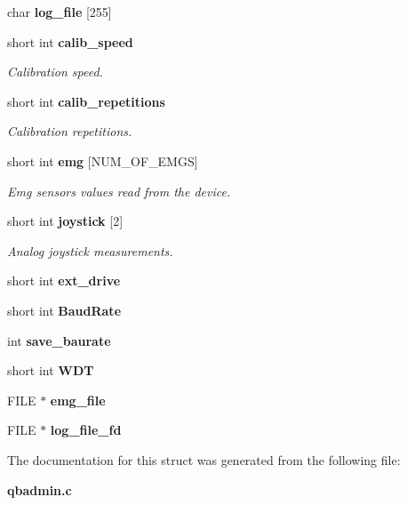 \begin{DoxyCompactItemize}
char {\bfseries log\+\_\+file} [255]
\item 
\mbox{\label{structglobal__args_a74aee2224894f2773538b376bcdd3a65}} 
short int \textbf{ calib\+\_\+speed}
\begin{DoxyCompactList}\small\item\em Calibration speed. \end{DoxyCompactList}\item 
\mbox{\label{structglobal__args_a97358fe57110982e565254fa7310cf8f}} 
short int \textbf{ calib\+\_\+repetitions}
\begin{DoxyCompactList}\small\item\em Calibration repetitions. \end{DoxyCompactList}\item 
\mbox{\label{structglobal__args_ac99613e9febb46b081ae696a20e34c62}} 
short int \textbf{ emg} [N\+U\+M\+\_\+\+O\+F\+\_\+\+E\+M\+GS]
\begin{DoxyCompactList}\small\item\em Emg sensors values read from the device. \end{DoxyCompactList}\item 
\mbox{\label{structglobal__args_a0cace64ae2459f06bc0bda1979b0c06f}} 
short int \textbf{ joystick} [2]
\begin{DoxyCompactList}\small\item\em Analog joystick measurements. \end{DoxyCompactList}\item 
\mbox{\label{structglobal__args_af848f8d2dca8dfbccc182293c8ba25bf}} 
short int {\bfseries ext\+\_\+drive}
\item 
\mbox{\label{structglobal__args_a8f68c2db71004b2beac47c7ce6feb94c}} 
short int {\bfseries Baud\+Rate}
\item 
\mbox{\label{structglobal__args_a15a8bc4e37e5294ee939c1dd620095a8}} 
int {\bfseries save\+\_\+baurate}
\item 
\mbox{\label{structglobal__args_abd2a5fb7d2e58a98c4394067565b5492}} 
short int {\bfseries W\+DT}
\item 
\mbox{\label{structglobal__args_ac3ca959d3b7ae254f86531e0b82affcb}} 
F\+I\+LE $\ast$ {\bfseries emg\+\_\+file}
\item 
\mbox{\label{structglobal__args_a5fbba9db8f8d479d7607ec6e8617026a}} 
F\+I\+LE $\ast$ {\bfseries log\+\_\+file\+\_\+fd}
\end{DoxyCompactItemize}


The documentation for this struct was generated from the following file\+:\begin{DoxyCompactItemize}
\item 
\textbf{ qbadmin.\+c}\end{DoxyCompactItemize}
